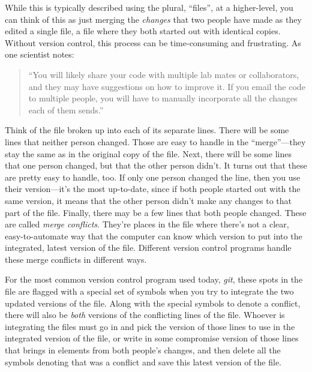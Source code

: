 \documentclass[]{tufte-book}
\begin{document}
While this is typically described using the plural, ``files'', at a higher-level,
you can think of this as just merging the \emph{changes} that two people have made as
they edited a single file, a file where they both started out with identical
copies. Without version control, this process can be time-consuming and
frustrating. As one scientist notes:

\begin{quote}
``You will likely share your code with multiple lab mates or collaborators,
and they may have suggestions on how to improve it. If you email the code
to multiple people, you will have to manually incorporate all the changes
each of them sends.'' \citep{blischak2016quick}
\end{quote}

Think of the file broken up into each of its separate lines. There will be some
lines that neither person changed. Those are easy to handle in the
``merge''---they stay the same as in the original copy of the file. Next, there
will be some lines that one person changed, but that the other person didn't. It
turns out that these are pretty easy to handle, too. If only one person changed
the line, then you use their version---it's the most up-to-date, since if both
people started out with the same version, it means that the other person didn't
make any changes to that part of the file. Finally, there may be a few lines
that both people changed. These are called \emph{merge conflicts}. They're places in
the file where there's not a clear, easy-to-automate way that the computer can
know which version to put into the integrated, latest version of the file.
Different version control programs handle these merge conflicts in different
ways.

For the most common version control program used today, \emph{git}, these spots in
the file are flagged with a special set of symbols when you try to integrate the
two updated versions of the file. Along with the special symbols to denote a
conflict, there will also be \emph{both} versions of the conflicting lines of the
file. Whoever is integrating the files must go in and pick the version of those
lines to use in the integrated version of the file, or write in some compromise
version of those lines that brings in elements from both people's changes, and
then delete all the symbols denoting that was a conflict and save this latest
version of the file.
\end{document}
